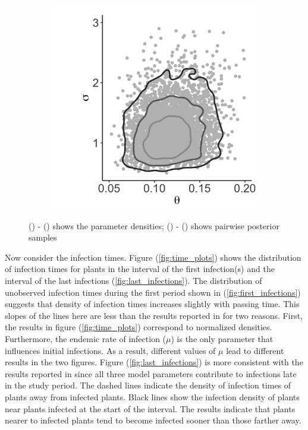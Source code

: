 \documentclass{uwstat572}
\begin{document}
\begin{figure}[H]
\begin{subfigure}[b]{0.3\textwidth}
		\caption{}
		\label{fig:muTheta}
	\end{subfigure}
	\hfill
	\begin{subfigure}[b]{0.3\textwidth}
		\includegraphics[width=\textwidth]{figures/figure_2f.png}
		\caption{}
		\label{fig:sigmaTheta}
	\end{subfigure} 
	\caption{() - () shows the parameter densities;  () - () shows pairwise posterior samples }
	\label{fig:muSigmaThetaDensities}
\end{figure} 

Now consider the infection times. 
Figure (\ref{fig:time_plots}) shows the distribution of infection times for plants in the interval of the first infection(s) and the interval of the last infections (\ref{fig:last_infections}). 
The distribution of unobserved infection times during the first period shown in (\ref{fig:first_infections}) suggests that density of infection times increases slightly with passing time. 
This slopes of the lines here are less than the results reported in \citet{Brown} for two reasons. 
First, the results in figure (\ref{fig:time_plots}) correspond to normalized densities. 
Furthermore, the endemic rate of infection ($\mu$) is the only parameter that influences initial infections. 
As a result, different values of $\mu$ lead to different results in the two figures. 
Figure (\ref{fig:last_infections}) is more consistent with the results reported in \citet{Brown} since all three model parameters contribute to infections late in the study period. 
The dashed lines indicate the density of infection times of plants away from infected plants. 
Black lines show the infection density of plants near plants infected at the start of the interval. 
The results indicate that plants nearer to infected plants tend to become infected sooner than those farther away. 
\end{document}

